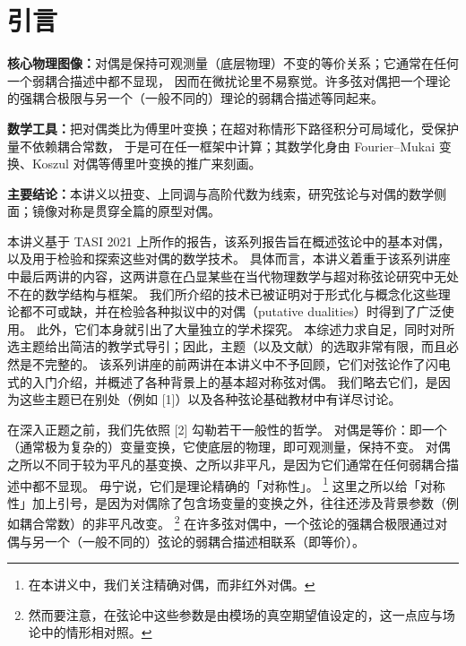 

\section{引言}

\begin{keytakeaway}
\textbf{核心物理图像：}对偶是保持可观测量（底层物理）不变的等价关系；它通常在任何一个弱耦合描述中都不显现，
因而在微扰论里不易察觉。许多弦对偶把一个理论的强耦合极限与另一个（一般不同的）理论的弱耦合描述等同起来。

\textbf{数学工具：}把对偶类比为傅里叶变换；在超对称情形下路径积分可局域化，受保护量不依赖耦合常数，
于是可在任一框架中计算；其数学化身由 Fourier--Mukai 变换、Koszul 对偶等傅里叶变换的推广来刻画。

\textbf{主要结论：}本讲义以扭变、上同调与高阶代数为线索，研究弦论与对偶的数学侧面；镜像对称是贯穿全篇的原型对偶。
\end{keytakeaway}

本讲义基于 TASI 2021 上所作的报告，该系列报告旨在概述弦论中的基本对偶，以及用于检验和探索这些对偶的数学技术。
具体而言，本讲义着重于该系列讲座中最后两讲的内容，这两讲意在凸显某些在当代物理数学与超对称弦论研究中无处不在的数学结构与框架。
我们所介绍的技术已被证明对于形式化与概念化这些理论都不可或缺，并在检验各种拟议中的对偶（putative dualities）时得到了广泛使用。
此外，它们本身就引出了大量独立的学术探究。
本综述力求自足，同时对所选主题给出简洁的教学式导引；因此，主题（以及文献）的选取非常有限，而且必然是不完整的。
该系列讲座的前两讲在本讲义中不予回顾，它们对弦论作了闪电式的入门介绍，并概述了各种背景上的基本超对称弦对偶。
我们略去它们，是因为这些主题已在别处（例如 [1]）以及各种弦论基础教材中有详尽讨论。

在深入正题之前，我们先依照 [2] 勾勒若干一般性的哲学。
对偶是等价：即一个（通常极为复杂的）变量变换，它使底层的物理，即可观测量，保持不变。
对偶之所以不同于较为平凡的基变换、之所以非平凡，是因为它们通常在任何弱耦合描述中都不显现。
毋宁说，它们是理论精确的「对称性」。
\footnote{在本讲义中，我们关注精确对偶，而非红外对偶。}
这里之所以给「对称性」加上引号，是因为对偶除了包含场变量的变换之外，往往还涉及背景参数（例如耦合常数）的非平凡改变。
\footnote{然而要注意，在弦论中这些参数是由模场的真空期望值设定的，这一点应与场论中的情形相对照。}
在许多弦对偶中，一个弦论的强耦合极限通过对偶与另一个（一般不同的）弦论的弱耦合描述相联系（即等价）。

